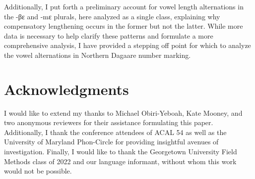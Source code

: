 \documentclass[output=paper,colorlinks,citecolor=brown,
]{langscibook}
\begin{document}
Additionally, I put forth a preliminary account for vowel length alternations in the -βɛ and -mɛ plurals, here analyzed as a single class, explaining why compensatory lengthening occurs in the former but not the latter. While more data is necessary to help clarify these patterns and formulate a more comprehensive analysis, I have provided a stepping off point for which to analyze the vowel alternations in Northern Dagaare number marking. 

\section*{Acknowledgments}
I would like to extend my thanks to Michael Obiri-Yeboah, Kate Mooney, and two anonymous reviewers for their assistance formulating this paper. Additionally, I thank the conference attendees of ACAL 54 as well as the University of Maryland Phon-Circle for providing insightful avenues of investigation. Finally, I would like to thank the Georgetown University Field Methods class of 2022 and our language informant, without whom this work would not be possible.

\sloppy %

\printbibliography[heading=subbibliography,notkeyword=this]
\end{document}
